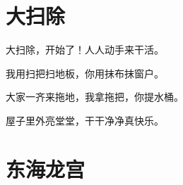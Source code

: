 \documentclass[12pt,UTF-8,openany]{ctexbook}
\begin{document}
\chapter{大扫除}

\begin{large}
    
    大扫除，开始了！人人动手来干活。
    
    我用扫把扫地板，你用抹布抹窗户。
    
    大家一齐来拖地，我拿拖把，你提水桶。
    
    屋子里外亮堂堂，干干净净真快乐。
    
\end{large}


\clearpage

\begin{center}
    
    
\end{center}


\hanzibox{}\hanzibox{}\hanzibox{}\hanzibox{}\hspace{1em}\hanzibox{}\hanzibox{}\hanzibox{}\hanzibox{}

\hanzibox{}\hanzibox{}\hanzibox{}\hanzibox{}\hspace{1em}\hanzibox{}\hanzibox{}\hanzibox{}\hanzibox{}

\hanzibox{}\hanzibox{}\hanzibox{}\hanzibox{}\hspace{1em}\hanzibox{}\hanzibox{}\hanzibox{}\hanzibox{}

\hanzibox{}\hanzibox{}\hanzibox{}\hanzibox{}\hspace{1em}\hanzibox{}\hanzibox{}\hanzibox{}\hanzibox{}

\hanzibox{}\hanzibox{}\hanzibox{}\hanzibox{}\hspace{1em}\hanzibox{}\hanzibox{}\hanzibox{}\hanzibox{}






\chapter{东海龙宫}
\end{document}
